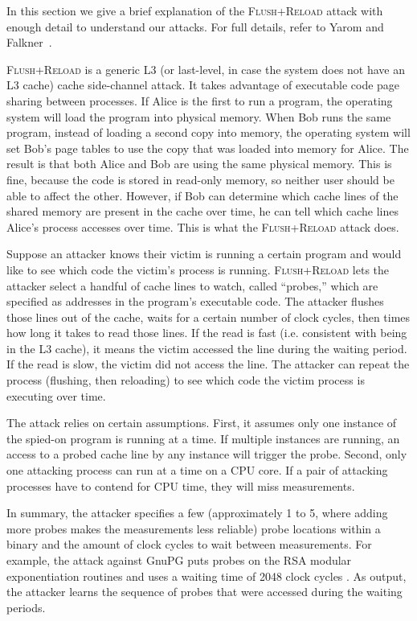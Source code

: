 \documentclass[letterpaper,twocolumn,10pt]{article}
\begin{document}
In this section we give a brief explanation of the \textsc{Flush+Reload} attack
with enough detail to understand our attacks. For full details, refer to
Yarom and Falkner~\cite{yarom2013flush}.

\textsc{Flush+Reload} is a generic L3 (or last-level, in case the system does
not have an L3 cache) cache side-channel attack. It takes advantage of
executable code page sharing between processes. If Alice is the first to run
a program, the operating system will load the program into physical memory. When
Bob runs the same program, instead of loading a second copy into memory, the
operating system will set Bob's page tables to use the copy that was loaded into
memory for Alice. The result is that both Alice and Bob are using the same
physical memory. This is fine, because the code is stored in read-only memory,
so neither user should be able to affect the other. However, if Bob can
determine which cache lines of the shared memory are present in the cache over
time, he can tell which cache lines Alice's process accesses over time. This is
what the \textsc{Flush+Reload} attack does.

Suppose an attacker knows their victim is running a certain program and would
like to see which code the victim's process is running. \textsc{Flush+Reload}
lets the attacker select a handful of cache lines to watch, called ``probes,''
which are specified as addresses in the program's executable code.
The attacker flushes those lines out of the cache, waits for a certain number of
clock cycles, then times how long it takes to read those lines. If the read is
fast (i.e. consistent with being in the L3 cache), it means the victim accessed
the line during the waiting period. If the read is slow, the victim did not
access the line. The attacker can repeat the process (flushing, then reloading)
to see which code the victim process is executing over time.

The attack relies on certain assumptions.  First, it
assumes only one instance of the spied-on program is running at
a time. If multiple instances are running, an access to a probed cache line by
any instance will trigger the probe. Second, only one attacking process can run at
a time on a CPU core. If a pair of attacking processes have to contend for CPU
time, they will miss measurements.

In summary, the attacker specifies a few (approximately 1 to 5, where adding more
probes makes the measurements less reliable) probe locations within a binary and
the amount of clock cycles to wait between measurements.
For example, the attack against GnuPG puts probes on the RSA modular
exponentiation routines and uses a waiting time of 2048 clock cycles
\cite{yarom2013flush}.
As output, the attacker
learns the sequence of probes that were accessed during the waiting periods.
\end{document}
